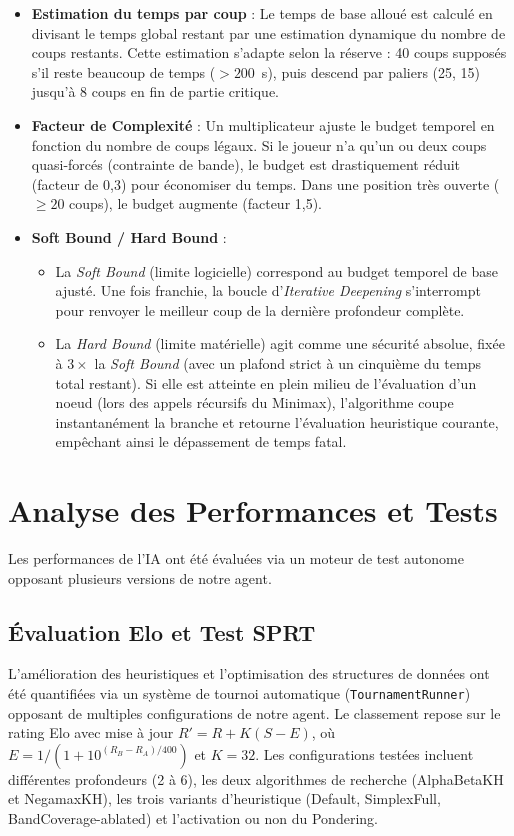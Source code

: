 \documentclass[12pt,a4paper]{article}
\begin{document}
\begin{itemize}
    \item \textbf{Estimation du temps par coup} : Le temps de base alloué est calculé en divisant le temps global restant par une estimation dynamique du nombre de coups restants. Cette estimation s'adapte selon la réserve : 40 coups supposés s'il reste beaucoup de temps ($> 200$~s), puis descend par paliers (25, 15) jusqu'à 8 coups en fin de partie critique.
    \item \textbf{Facteur de Complexité} : Un multiplicateur ajuste le budget temporel en fonction du nombre de coups légaux. Si le joueur n'a qu'un ou deux coups quasi-forcés (contrainte de bande), le budget est drastiquement réduit (facteur de 0,3) pour économiser du temps. Dans une position très ouverte ($\ge 20$ coups), le budget augmente (facteur 1,5).
    \item \textbf{Soft Bound / Hard Bound} : 
    \begin{itemize}
        \item La \textit{Soft Bound} (limite logicielle) correspond au budget temporel de base ajusté. Une fois franchie, la boucle d'\textit{Iterative Deepening} s'interrompt pour renvoyer le meilleur coup de la dernière profondeur complète.
        \item La \textit{Hard Bound} (limite matérielle) agit comme une sécurité absolue, fixée à $3 \times$ la \textit{Soft Bound} (avec un plafond strict à un cinquième du temps total restant). Si elle est atteinte en plein milieu de l'évaluation d'un noeud (lors des appels récursifs du Minimax), l'algorithme coupe instantanément la branche et retourne l'évaluation heuristique courante, empêchant ainsi le dépassement de temps fatal.
    \end{itemize}
\end{itemize}





\section{Analyse des Performances et Tests}
Les performances de l'IA ont été évaluées via un moteur de test autonome opposant plusieurs versions de notre agent.


\subsection{Évaluation Elo et Test SPRT}
L'amélioration des heuristiques et l'optimisation des structures de données ont été quantifiées via un système de tournoi automatique (\texttt{TournamentRunner}) opposant de multiples configurations de notre agent. Le classement repose sur le rating Elo avec mise à jour $R' = R + K(S - E)$, où $E = 1/(1 + 10^{(R_B - R_A)/400})$ et $K = 32$. Les configurations testées incluent différentes profondeurs (2 à 6), les deux algorithmes de recherche (AlphaBetaKH et NegamaxKH), les trois variants d'heuristique (Default, SimplexFull, BandCoverage-ablated) et l'activation ou non du Pondering.
\end{document}
